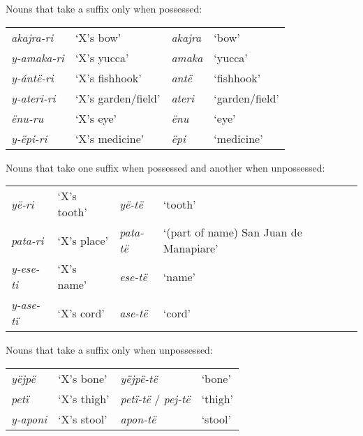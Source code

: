 \documentclass{memoir}
\begin{document}
\ex\label{onlypossessed} Nouns that take a suffix only when possessed:

\begin{tabular}[t]{llll}

 \emph{akajra-ri} &          ‘X’s bow’ & \emph{akajra} &          ‘bow’ \\

\emph{y-amaka-ri} &        ‘X’s yucca’ &  \emph{amaka} &        ‘yucca’ \\
 \emph{y-ántë-ri} &     ‘X’s fishhook’ &   \emph{antë} &     ‘fishhook’ \\
\emph{y-ateri-ri} & ‘X’s garden/field’ &  \emph{ateri} & ‘garden/field’ \\
    \emph{ënu-ru} &          ‘X’s eye’ &    \emph{ënu} &          ‘eye’ \\
  \emph{y-ëpi-ri} &     ‘X’s medicine’ &    \emph{ëpi} &     ‘medicine’ \\

\end{tabular}
 \xe

\ex\label{diffpossessed} Nouns that take one suffix when possessed and
another when unpossessed:

\begin{tabular}[t]{llll}

   \emph{yë-ri} & ‘X’s tooth’ &   \emph{yë-të} &                                ‘tooth’ \\

 \emph{pata-ri} & ‘X’s place’ & \emph{pata-të} & ‘(part of name) San Juan de Manapiare’ \\
\emph{y-ese-ti} & ‘X’s name’  &  \emph{ese-të} &                                 ‘name’ \\
\emph{y-ase-tï} & ‘X’s cord’  &  \emph{ase-të} &                                 ‘cord’ \\

\end{tabular}
 \xe

\ex\label{suffunpossessed} Nouns that take a suffix only when
unpossessed:

\begin{tabular}[t]{llll}

  \emph{yëjpë} &  ‘X’s bone’ &                \emph{yëjpë-të} &  ‘bone’ \\

   \emph{petï} & ‘X’s thigh’ & \emph{petï-të} / \emph{pej-të} & ‘thigh’ \\
\emph{y-aponi} & ‘X’s stool’ &                 \emph{apon-të} & ‘stool’ \\

\end{tabular}
 \xe
\end{document}
